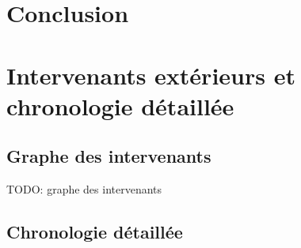 \documentclass[11pt,a4paper]{article}
\theoremstyle{plain}
\theoremstyle{definition}
\begin{document}
\section{Conclusion}



\appendix
\section{Intervenants extérieurs et chronologie détaillée}
\subsection{Graphe des intervenants}
TODO: graphe des intervenants
\subsection{Chronologie détaillée}
\end{document}
